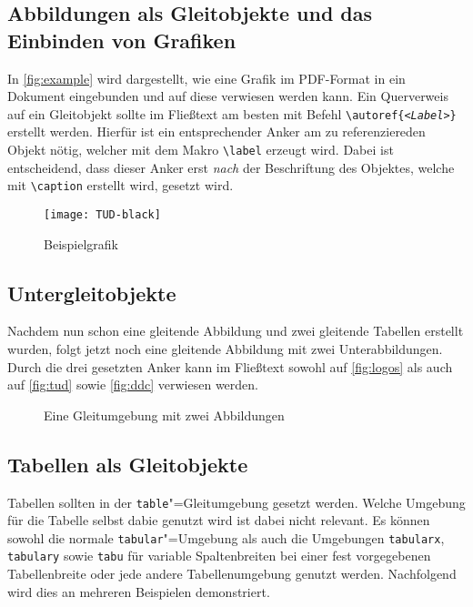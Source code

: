 \documentclass[english,ngerman]{tudscrreprt}
\begin{document}
\subsection{Abbildungen als Gleitobjekte und das Einbinden von Grafiken}
In \autoref{fig:example} wird dargestellt, wie eine Grafik im PDF-Format
in ein Dokument eingebunden und auf diese verwiesen werden kann. Ein
Querverweis auf ein Gleitobjekt sollte im Fließtext am besten mit Befehl
\texttt{\textbackslash autoref\{\emph{<Label>}\}} erstellt werden.
Hierfür ist ein entsprechender Anker am zu referenziereden Objekt nötig,
welcher mit dem Makro \texttt{\textbackslash label} erzeugt wird. Dabei
ist entscheidend, dass dieser Anker erst \emph{nach} der Beschriftung des
Objektes, welche mit \texttt{\textbackslash caption} erstellt wird,
gesetzt wird.
\begin{figure}
\centering
\texttt{[image: TUD-black]}
\caption{Beispielgrafik}\label{fig:example}
\end{figure}
\subsection{Untergleitobjekte}
Nachdem nun schon eine gleitende Abbildung und zwei gleitende Tabellen
erstellt wurden, folgt jetzt noch eine gleitende Abbildung mit zwei
Unterabbildungen. Durch die drei gesetzten Anker kann im Fließtext
sowohl auf \autoref{fig:logos} als auch auf \autoref{fig:tud} sowie
\autoref{fig:ddc} verwiesen werden.
\begin{figure}
%
{\caption{Eine Gleitumgebung mit zwei Abbildungen}\label{fig:logos}}%
\end{figure}
\subsection{Tabellen als Gleitobjekte}
Tabellen sollten in der \texttt{table}"=Gleitumgebung gesetzt werden.
Welche Umgebung für die Tabelle selbst dabie genutzt wird ist dabei
nicht relevant. Es können sowohl die normale \texttt{tabular}"=Umgebung
als auch die Umgebungen \texttt{tabularx}, \texttt{tabulary} sowie
\texttt{tabu} für variable Spaltenbreiten bei einer fest vorgegebenen
Tabellenbreite oder jede andere Tabellenumgebung genutzt werden.
Nachfolgend wird dies an mehreren Beispielen demonstriert.
\end{document}

